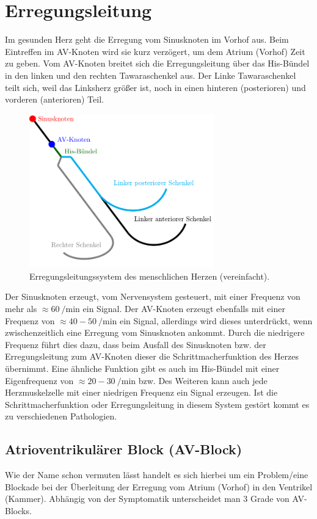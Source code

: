 \section{Erregungsleitung}
Im gesunden Herz geht die Erregung vom Sinusknoten im Vorhof aus. Beim Eintreffen im AV-Knoten wird sie kurz verzögert, um dem Atrium (Vorhof) Zeit zu geben. Vom AV-Knoten breitet sich die Erregungsleitung über das His-Bündel in den linken und den rechten Tawaraschenkel aus. Der Linke Tawaraschenkel teilt sich, weil das Linksherz größer ist, noch in einen hinteren (posterioren) und vorderen (anterioren) Teil.
\begin{figure}[H]
	\centering
	\includegraphics[width=8cm]{./img/Erregungsleitung}
	\caption{Erregungsleitungssystem des menschlichen Herzen (vereinfacht).}\label{01:Erreigungsleitungssystem}
\end{figure}
Der Sinusknoten erzeugt, vom Nervensystem gesteuert, mit einer Frequenz von mehr als $\approx\SI{60}{\per\minute}$ ein Signal. Der AV-Knoten erzeugt ebenfalls mit einer Frequenz von $\approx\num{40}-\SI{50}{\per\minute}$ ein Signal, allerdings wird dieses unterdrückt, wenn zwischenzeitlich eine Erregung vom Sinusknoten ankommt. Durch die niedrigere Frequenz führt dies dazu, dass beim Ausfall des Sinusknoten bzw. der Erregungsleitung zum AV-Knoten dieser die Schrittmacherfunktion des Herzes übernimmt. Eine ähnliche Funktion gibt es auch im His-Bündel mit einer Eigenfrequenz von $\approx\num{20}-\SI{30}{\per\minute}$ bzw. Des Weiteren kann auch jede Herzmuskelzelle mit einer niedrigen Frequenz ein Signal erzeugen. Ist die Schrittmacherfunktion oder Erregungsleitung in diesem System gestört kommt es zu verschiedenen Pathologien.

\subsection{Atrioventrikulärer Block (AV-Block)}
Wie der Name schon vermuten lässt handelt es sich hierbei um ein Problem/eine Blockade bei der Überleitung der Erregung vom Atrium (Vorhof) in den Ventrikel (Kammer). Abhängig von der Symptomatik unterscheidet man 3 Grade von AV-Blocks.


